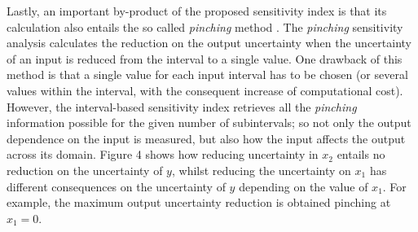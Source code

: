 \documentclass[twocolumn]{rps-esrel2022}
\begin{document}
Lastly, an important by-product of the proposed sensitivity index is that its calculation also entails the so called \textit{pinching} method \cite{ferson2006sensitivity, gray2022inference}.
The \textit{pinching} sensitivity analysis calculates the reduction on the output uncertainty when the uncertainty of an input is reduced from the interval to a single value.
One drawback of this method is that a single value for each input interval has to be chosen (or several values within the interval, with the consequent
increase of computational cost).
However, the interval-based sensitivity index retrieves all the \textit{pinching} information possible for the given number of subintervals; so not only the
output dependence on the input is measured, but also how the input affects the output across its domain.
Figure 4 shows how reducing uncertainty in $x_2$ entails no reduction on the uncertainty of $y$, whilst reducing the uncertainty on $x_1$ has different consequences on the
uncertainty of $y$ depending on the value of $x_1$.
For example, the maximum output uncertainty reduction is obtained pinching at $x_1 = 0$.
\end{document}
